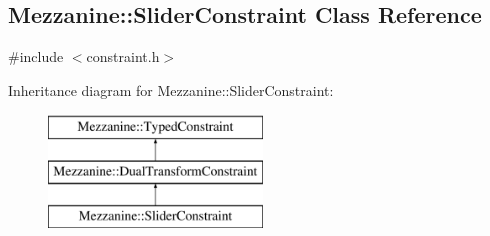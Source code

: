\hypertarget{classMezzanine_1_1SliderConstraint}{
\subsection{Mezzanine::SliderConstraint Class Reference}
\label{classMezzanine_1_1SliderConstraint}
}


{\ttfamily \#include $<$constraint.h$>$}

Inheritance diagram for Mezzanine::SliderConstraint:\begin{figure}[H]
\begin{center}
\leavevmode
\includegraphics[height=3.000000cm]{classMezzanine_1_1SliderConstraint}
\end{center}
\end{figure}
